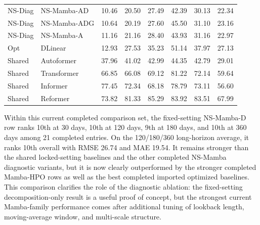 \begin{table}[t]
{\begin{tabular}{llrrrrrr}
NS-Diag & NS-Mamba-AD & 10.46 & 20.50 & 27.49 & 42.39 & 30.13 & 22.34 \\
NS-Diag & NS-Mamba-ADG & 10.64 & 20.19 & 27.60 & 45.50 & 31.10 & 23.16 \\
NS-Diag & NS-Mamba-A & 11.16 & 21.16 & 28.40 & 43.93 & 31.16 & 22.97 \\
Opt & DLinear & 12.93 & 27.53 & 35.23 & 51.14 & 37.97 & 27.13 \\
Shared & Autoformer & 37.96 & 41.02 & 42.99 & 44.35 & 42.79 & 29.01 \\
Shared & Transformer & 66.85 & 66.08 & 69.12 & 81.22 & 72.14 & 59.64 \\
Shared & Informer & 77.45 & 72.34 & 68.18 & 78.79 & 73.11 & 56.60 \\
Shared & Reformer & 73.82 & 81.33 & 85.29 & 83.92 & 83.51 & 67.99 \\
\bottomrule
\end{tabular}
}
\end{table}

Within this current completed comparison set, the fixed-setting NS-Mamba-D row ranks 10th at 30 days, 10th at 120 days, 9th at 180 days, and 10th at 360 days among 21 completed entries.
On the 120/180/360 long-horizon average, it ranks 10th overall with RMSE 26.74 and MAE 19.54.
It remains stronger than the shared locked-setting baselines and the other completed NS-Mamba diagnostic variants, but it is now clearly outperformed by the stronger completed Mamba-HPO rows as well as the best completed imported optimized baselines.
This comparison clarifies the role of the diagnostic ablation: the fixed-setting decomposition-only result is a useful proof of concept, but the strongest current Mamba-family performance comes after additional tuning of lookback length, moving-average window, and multi-scale structure.

